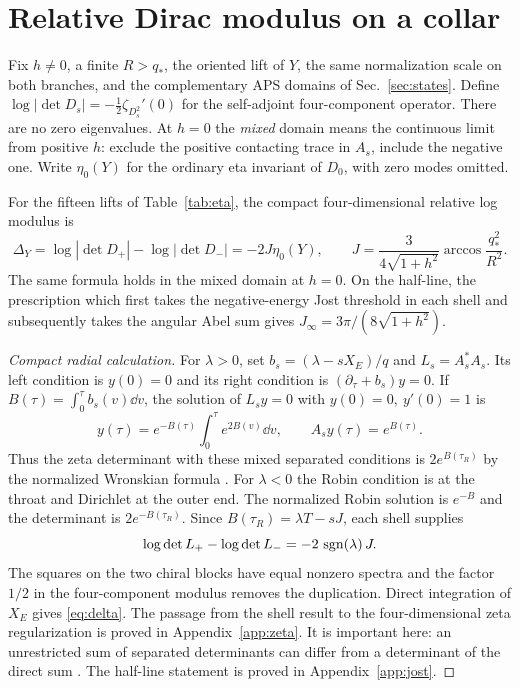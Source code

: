 \section{Relative Dirac modulus on a collar}\label{sec:det}
Fix $h\ne0$, a finite $R>q_*$, the oriented lift of $Y$, the same normalization scale on both branches, and the complementary APS domains of Sec.~\ref{sec:states}. Define $\log|\det D_s|=-\frac12\zeta_{D_s^2}'(0)$ for the self-adjoint four-component operator. There are no zero eigenvalues. At $h=0$ the \emph{mixed} domain means the continuous limit from positive $h$: exclude the positive contacting trace in $A_s$, include the negative one. Write $\eta_0(Y)$ for the ordinary eta invariant of $D_0$, with zero modes omitted.

\begin{theorem}\label{thm:det}
For the fifteen lifts of Table~\ref{tab:eta}, the compact four-dimensional relative log modulus is
\begin{equation}
 \Delta_Y=\log|\det D_+|-\log|\det D_-|=-2J\eta_0(Y),\qquad
 J=\frac{3}{4\sqrt{1+h^2}}\arccos\frac{q_*^2}{R^2}.
 \label{eq:delta}
\end{equation}
The same formula holds in the mixed domain at $h=0$. On the half-line, the prescription which first takes the negative-energy Jost threshold in each shell and subsequently takes the angular Abel sum gives $J_\infty=3\pi/(8\sqrt{1+h^2})$.
\end{theorem}

\begin{proof}[Compact radial calculation]
For $\lambda>0$, set $b_s=(\lambda-sX_E)/q$ and $L_s=A_s^*A_s$. Its left condition is $y(0)=0$ and its right condition is $(\partial_\tau+b_s)y=0$. If $B(\tau)=\int_0^\tau b_s(v)\dd v$, the solution of $L_sy=0$ with $y(0)=0,\ y'(0)=1$ is
\[
 y(\tau)=e^{-B(\tau)}\int_0^\tau e^{2B(v)}\dd v,\qquad
 A_sy(\tau)=e^{B(\tau)} .
\]
Thus the zeta determinant with these mixed separated conditions is $2e^{B(\tau_R)}$ by the normalized Wronskian formula \cite{LV}. For $\lambda<0$ the Robin condition is at the throat and Dirichlet at the outer end. The normalized Robin solution is $e^{-B}$ and the determinant is $2e^{-B(\tau_R)}$. Since $B(\tau_R)=\lambda T-sJ$, each shell supplies
\[
 \log\det L_+-\log\det L_-=-2\,\operatorname{sgn}(\lambda)\,J .
\]
The squares on the two chiral blocks have equal nonzero spectra and the factor $1/2$ in the four-component modulus removes the duplication. Direct integration of $X_E$ gives \eqref{eq:delta}. The passage from the shell result to the four-dimensional zeta regularization is proved in Appendix~\ref{app:zeta}. It is important here: an unrestricted sum of separated determinants can differ from a determinant of the direct sum \cite{LVsum}. The half-line statement is proved in Appendix~\ref{app:jost}.
\end{proof}

